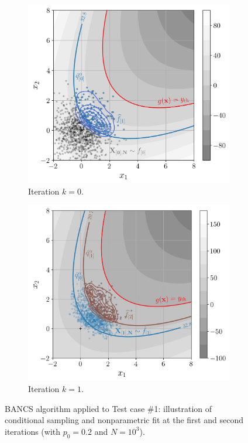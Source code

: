 \begin{figure}
    \centering
    \begin{subfigure}[b]{0.49\linewidth}
        \centering
        \includegraphics[width=\linewidth]{part3/figures/BANCS/bancs_illustration0.jpg}
        \caption{Iteration $k=0$.}
    \end{subfigure}
    \begin{subfigure}[b]{0.49\linewidth}
        \centering
        \includegraphics[width=\linewidth]{part3/figures/BANCS/bancs_illustration1.jpg}
        \caption{Iteration $k=1$.}
    \end{subfigure}
    \caption{BANCS algorithm applied to Test case \#1: illustration of conditional sampling and nonparametric fit at the first and second iterations (with $p_0=0.2$ and $N=10^3$).}
    \label{fig:bancs_illustration}
\end{figure}


